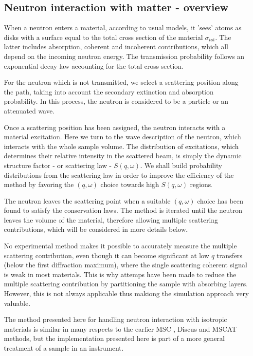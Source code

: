 \subsection{Neutron interaction with matter - overview}

When a neutron enters a material, according to usual models, it 'sees' atoms as disks with a surface equal to the total cross section of the material $\sigma_{tot}$. The latter includes absorption, coherent and incoherent contributions, which all depend on the incoming neutron energy.
The transmission probability follows an exponential decay law accounting for the total cross section.

For the neutron which is not transmitted, we select a scattering position along the path, taking into account the secondary extinction and absorption probability. In this process, the neutron is considered to be a particle or an attenuated wave.

Once a scattering position has been assigned, the neutron interacts with a material excitation. Here we turn to the wave description of the neutron, which interacts with the whole sample volume. The distribution of excitations, which determines their relative intensity in the scattered beam, is simply the dynamic structure factor - or scattering law - $S(q,\omega)$. We shall build probability distributions from the scattering law in order to improve the efficiency of the method by favoring the $(q,\omega)$ choice towards high $S(q,\omega)$ regions.

The neutron leaves the scattering point when a suitable $(q, \omega)$ choice has been found to satisfy the conservation laws. The method is iterated until the neutron leaves the volume of the material, therefore allowing multiple scattering contributions, which will be considered in more details below.

No experimental method makes it possible to accurately measure the multiple scattering contribution, even though it can become significant at low $q$ transfers (below the first diffraction maximum), where the single scattering coherent signal is weak in most materials. This is why attemps have been made to reduce the multiple scattering contribution by partitioning the sample with absorbing layers. However, this is not always applicable thus makiong the simulation approach very valuable.

The method presented here for handling neutron interaction with isotropic materials is similar in many respects to the earlier MSC \cite{msc}, Discus \cite{discus} and MSCAT \cite{mscat} methods, but the implementation presented here is part of a more general treatment of a sample in an instrument.

